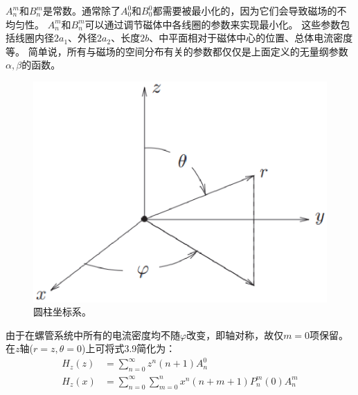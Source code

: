 $A_n^m$和$B_n^m$是常数。通常除了$A_0^0$和$B_0^0$都需要被最小化的，因为它们会导致磁场的不均匀性。
$A_n^m$和$B_n^m$可以通过调节磁体中各线圈的参数来实现最小化。
这些参数包括线圈内径$2a_1$、外径$2a_2$、长度$2b$、中平面相对于磁体中心的位置、总体电流密度等。
简单说，所有与磁场的空间分布有关的参数都仅仅是上面定义的无量纲参数$\alpha, \beta$的函数。
\begin{figure}[htbp]
	\centering
	\includegraphics[scale=0.5]{chpt3/figs/fig3.4.eps}
	\caption{圆柱坐标系。}
\end{figure}

由于在螺管系统中所有的电流密度均不随$\varphi$改变，即轴对称，故仅$m=0$项保留。
在$z$轴($r=z,\theta=0$)上可将式3.9简化为：
\begin{subequations}\label{eqn:solenoid coil hz1}
\begin{align}
H_z(z)&=\sum_{n=0}^\infty z^n(n+1)A_n^0 \\
H_z(x)&=\sum_{n=0}^\infty \sum_{m=0}^n x^n(n+m+1)P_n^m(0)A_n^m
\end{align}
\end{subequations}

